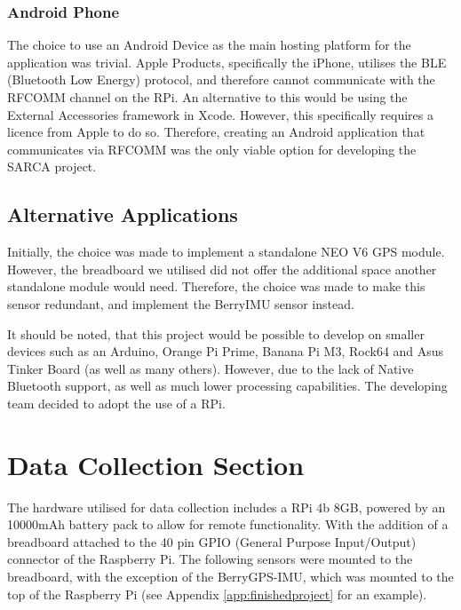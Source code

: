 \documentclass{ueacmpstyle}
\begin{document}
            
            \subsubsection{Android Phone}
            The choice to use an Android Device as the main hosting platform for the application was trivial. Apple Products, specifically the iPhone, utilises the BLE (Bluetooth Low Energy) protocol, and therefore cannot communicate with the RFCOMM channel on the RPi. An alternative to this would be using the External Accessories framework in Xcode. However, this specifically requires a licence from Apple to do so. Therefore, creating an Android application that communicates via RFCOMM was the only viable option for developing the SARCA project. 
        
        \subsection{Alternative Applications}
        Initially, the choice was made to implement a standalone NEO V6 \footnotemark[4] GPS module. However, the breadboard we utilised did not offer the additional space another standalone module would need. Therefore, the choice was made to make this sensor redundant, and implement the BerryIMU sensor instead. 
        
        It should be noted, that this project would be possible to develop on smaller devices such as an Arduino, Orange Pi Prime, Banana Pi M3, Rock64 and Asus Tinker Board (as well as many others). However, due to the lack of Native Bluetooth support, as well as much lower processing capabilities. The developing team decided to adopt the use of a RPi.
        
    
    
    \section{Data Collection Section} \label{Sec: Data Collection}
        The hardware utilised for data collection includes a RPi 4b 8GB, powered by an 10000mAh battery pack to allow for remote functionality. With the addition of a breadboard attached to the 40 pin GPIO (General Purpose Input/Output) connector of the Raspberry Pi. The following sensors were mounted to the breadboard, with the exception of the BerryGPS-IMU, which was mounted to the top of the Raspberry Pi (see Appendix \ref{app:finishedproject} for an example).
        
\end{document}
